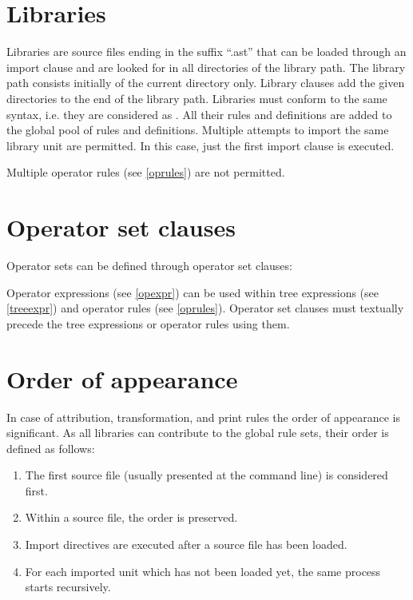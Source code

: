 \section{Libraries}

Libraries are source files ending in the suffix ``.ast'' that can
be loaded through an import clause and are looked for in all
directories of the library path. The library path consists initially
of the current directory only. Library clauses add the given directories
to the end of the library path. Libraries must conform to the
same syntax, i.e. they are considered as . All their
rules and definitions are added to the global pool of rules and definitions.
Multiple attempts to import the same library unit are permitted. In this
case, just the first import clause is executed.

Multiple operator rules (see \ref{oprules}) are not permitted.

\section{Operator set clauses}\label{opset}

Operator sets can be defined through operator set clauses:

\begin{grammar}
      \produces {} 
	 \lextoken{=}  \lextoken{;}
\end{grammar}

\noindent
Operator expressions (see \ref{opexpr}) can be used within
tree expressions (see \ref{treeexpr}) and operator rules
(see \ref{oprules}). Operator set clauses must textually precede the
tree expressions or operator rules using them.

\section{Order of appearance}

In case of attribution, transformation, and print rules the order
of appearance is significant. As all libraries can contribute to the
global rule sets, their order is defined as follows:

\begin{enumerate}
   \item The first source file (usually presented at the command line)
      is considered first.
   \item Within a source file, the order is preserved.
   \item Import directives are executed after a source file has been
      loaded.
   \item For each imported unit which has not been loaded yet, the
      same process starts recursively.
\end{enumerate}

